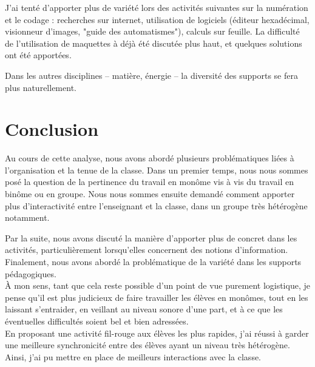 \documentclass[pdftex,a4paper,12pt]{article}
\begin{document}
	J'ai tenté d'apporter plus de variété lors des activités suivantes sur la numération et le codage : 
	recherches sur internet, utilisation de logiciels (éditeur hexadécimal, visionneur d'images, "guide des automatismes"), calculs sur feuille.
	La difficulté de l'utilisation de maquettes à déjà été discutée plus haut, et quelques solutions ont été apportées.

	Dans les autres disciplines -- matière, énergie -- la diversité des supports se fera plus naturellement.

	\section{Conclusion}
	Au cours de cette analyse, nous avons abordé plusieurs problématiques liées à l'organisation et la tenue de la classe.
	Dans un premier temps, nous nous sommes posé la question de la pertinence du travail en monôme vis à vis du travail en binôme ou en groupe.
	Nous nous sommes ensuite demandé comment apporter plus d'interactivité entre l'enseignant et la classe, dans un groupe très hétérogène notamment.

	Par la suite, nous avons discuté la manière d'apporter plus de concret dans les activités, particulièrement lorsqu'elles concernent des notions d'information.
	Finalement, nous avons abordé la problématique de la variété dans les supports pédagogiques.\\

	À mon sens, tant que cela reste possible d'un point de vue purement logistique, je pense qu'il est plus judicieux de faire travailler les élèves en monômes,
	tout en les laissant s'entraider, en veillant au niveau sonore d'une part, et à ce que les éventuelles difficultés soient bel et bien adressées.\\

	En proposant une activité \og{}fil-rouge\fg{} aux élèves les plus rapides, j'ai réussi à garder une meilleure synchronicité entre des élèves ayant un niveau
	très hétérogène. Ainsi, j'ai pu mettre en place de meilleurs interactions avec la classe.
	
\end{document}
